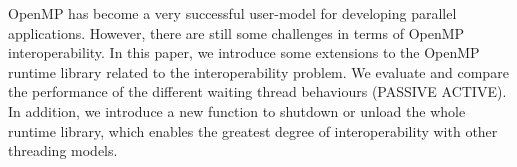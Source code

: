 OpenMP has become a very successful user-model for developing parallel applications. 
However, there are still some challenges in terms of OpenMP interoperability. 
In this paper, we introduce some extensions to the OpenMP runtime library related to the interoperability problem. 
We evaluate and compare the performance of the different waiting thread behaviours (PASSIVE \textbar ACTIVE). 
In addition, we introduce a new function to shutdown or unload the whole runtime library,
which enables the greatest degree of interoperability with other threading models.
